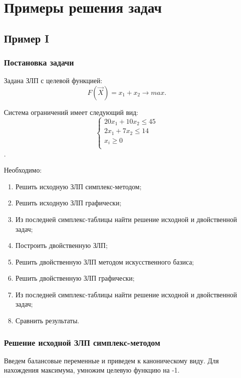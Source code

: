 \chapter{Примеры решения задач}
\section{Пример I}

\subsection{Постановка задачи}
\renewcommand{\labelenumi}{\arabic{enumi})}
Задана ЗЛП с целевой функцией:
\begin{equation}
	F(\vec{X}) = x_1+x_2 \to max.
\end{equation}

Система ограничений имеет следующий вид:
\begin{equation}
\label{system}
\begin{cases}
20x_1+10x_2 \le 45\\
2x_1+7x_2 \le 14\\
x_i \ge 0 \\
\end{cases}
\end{equation}.

Необходимо:
\begin{enumerate}
\item Решить исходную ЗЛП симплекс-методом;
\item Решить исходную ЗЛП графически;
\item Из последней симплекс-таблицы найти решение исходной и двойственной задач;
\item Построить двойственную ЗЛП;
\item Решить двойственную ЗЛП методом искусственного базиса;
\item Решить двойственную ЗЛП графически;
\item Из последней симплекс-таблицы найти решение исходной и двойственной задач;
\item Сравнить результаты.
\end{enumerate}

\subsection{Решение исходной ЗЛП симплекс-методом}
Введем балансовые переменные и приведем к каноническому виду.
Для нахождения максимума, умножим целевую функцию на -1.

